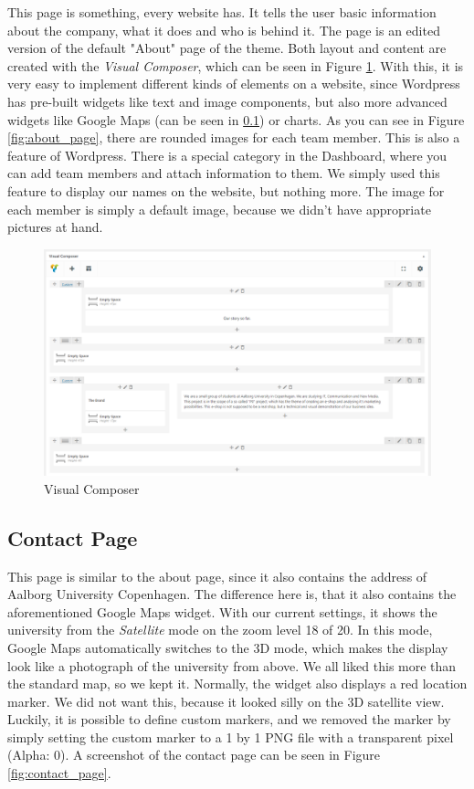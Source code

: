 \documentclass[12p]{article}
\begin{document}
This page is something, every website has. It tells the user basic information about the company, what it does and who is behind it. The page is an edited version of the default "About" page of the theme. Both layout and content are created with the \emph{Visual Composer}, which can be seen in Figure \ref{fig:visual_composer}. With this, it is very easy to implement different kinds of elements on a website, since Wordpress has pre-built widgets like text and image components, but also more advanced widgets like Google Maps (can be seen in \ref{ContactPage}) or charts. As you can see in Figure \ref{fig:about_page}, there are rounded images for each team member. This is also a feature of Wordpress. There is a special category in the Dashboard, where you can add team members and attach information to them. We simply used this feature to display our names on the website, but nothing more. The image for each member is simply a default image, because we didn't have appropriate pictures at hand. 

\begin{figure}[H]
    \centering
    \includegraphics[width=1\textwidth]{visual_composer}
    \caption{Visual Composer}
    \label{fig:visual_composer}
\end{figure}


\subsection{Contact Page} \label{ContactPage}

This page is similar to the about page, since it also contains the address of Aalborg University Copenhagen. The difference here is, that it also contains the aforementioned Google Maps widget. With our current settings, it shows the university from the \emph{Satellite} mode on the zoom level 18 of 20. In this mode, Google Maps automatically switches to the 3D mode, which makes the display look like a photograph of the university from above. We all liked this more than the standard map, so we kept it. Normally, the widget also displays a red location marker. We did not want this, because it looked silly on the 3D satellite view. Luckily, it is possible to define custom markers, and we removed the marker by simply setting the custom marker to a 1 by 1 PNG file with a transparent pixel (Alpha: 0). A screenshot of the contact page can be seen in Figure \ref{fig:contact_page}.
\end{document}
